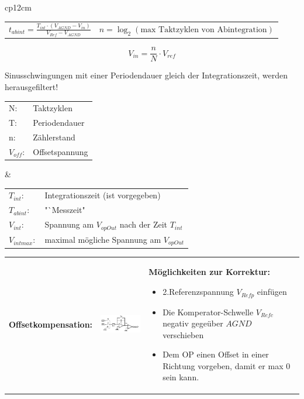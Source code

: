 \begin{longtable}{cp{12cm}}
\begin{tabular}{p{4cm}p{7cm}}
      $ t_{abint} = \frac{T_{int}\cdot (V_{AGND}-V_{in})}{V_{Ref}-V_{AGND}} $ &
      $ n = \log _2 (\text{max Taktzyklen von Abintegration}) $ \\
  \end{tabular}
  \[ V_{in} = \frac{n}{N} \cdot V_{ref} \]
  
 Sinusschwingungen mit einer Periodendauer gleich der Integrationszeit, werden herausgefiltert!\\
 
  \begin{tabular}{ll}
    N:&Taktzyklen\\
    T:&Periodendauer\\
    n:&Zählerstand\\
    $V_{off}$:&Offsetspannung\\
  \end{tabular} &
  
  \begin{tabular}{ll}
    $T_{int}$:&Integrationszeit (ist vorgegeben)\\
    $T_{abint}$:& "`Messzeit"\\
    $V_{int}$:&Spannung am $V_{opOut}$ nach der Zeit $T_{int}$\\
    $V_{intmax}:$&maximal mögliche Spannung am $V_{opOut}$\\
  \end{tabular}
\end{longtable}

\begin{longtable}{p{4cm}p{6cm}p{8cm}}
  \textbf{Offsetkompensation:} &
  \includegraphics[width=6cm, valign=t]{pictures/offsetkompensation} &
  \textbf{Möglichkeiten zur Korrektur:}
  \begin{itemize}
    \item 2.Referenzspannung $V_{Refp}$ einfügen
    \item Die Komperator-Schwelle $V_{Refc}$ negativ gegeüber $AGND$ verschieben
    \item Dem OP einen Offset in einer Richtung vorgeben, damit er max 0 sein kann.
  \end{itemize}
\end{longtable}

\newpage

